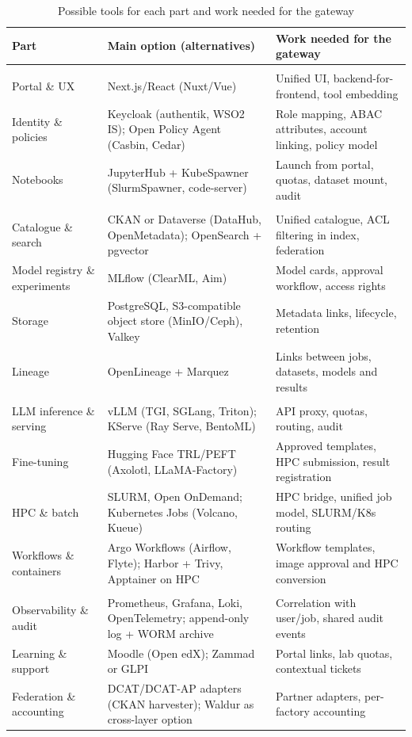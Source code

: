 \documentclass[conference,a4paper]{IEEEtran}
\begin{document}
\begin{table}[t]
\centering
\caption{Possible tools for each part and work needed for the gateway}
\label{tab:tools}
\footnotesize
\renewcommand{\arraystretch}{1.25}
\setlength{\tabcolsep}{4pt}
\newcommand{\grp}[1]{\multicolumn{3}{|l|}{\cellcolor{gray!12}\textbf{\textit{#1}}} \\ \hline}
\begin{tabular}{|>{\raggedright\arraybackslash}p{2.9cm}|>{\raggedright\arraybackslash}p{7.0cm}|>{\raggedright\arraybackslash}p{6.5cm}|}
\hline
\rowcolor{gray!30}
\textbf{Part} & \textbf{Main option (alternatives)} & \textbf{Work needed for the gateway} \\ \hline
\grp{User access}
Portal \& UX & Next.js/React (Nuxt/Vue) & Unified UI, backend-for-frontend, tool embedding \\ \hline
Identity \& policies & Keycloak (authentik, WSO2 IS); Open Policy Agent (Casbin, Cedar) & Role mapping, ABAC attributes, account linking, policy model \\ \hline
Notebooks & JupyterHub + KubeSpawner (SlurmSpawner, code-server) & Launch from portal, quotas, dataset mount, audit \\ \hline
\grp{Data and models}
Catalogue \& search & CKAN or Dataverse (DataHub, OpenMetadata); OpenSearch + pgvector & Unified catalogue, ACL filtering in index, federation \\ \hline
Model registry \& experiments & MLflow (ClearML, Aim) & Model cards, approval workflow, access rights \\ \hline
Storage & PostgreSQL, S3-compatible object store (MinIO/Ceph), Valkey & Metadata links, lifecycle, retention \\ \hline
Lineage & OpenLineage + Marquez & Links between jobs, datasets, models and results \\ \hline
\grp{Compute and inference}
LLM inference \& serving & vLLM (TGI, SGLang, Triton); KServe (Ray Serve, BentoML) & API proxy, quotas, routing, audit \\ \hline
Fine-tuning & Hugging Face TRL/PEFT (Axolotl, LLaMA-Factory) & Approved templates, HPC submission, result registration \\ \hline
HPC \& batch & SLURM, Open OnDemand; Kubernetes Jobs (Volcano, Kueue) & HPC bridge, unified job model, SLURM/K8s routing \\ \hline
Workflows \& containers & Argo Workflows (Airflow, Flyte); Harbor + Trivy, Apptainer on HPC & Workflow templates, image approval and HPC conversion \\ \hline
\grp{Operations and federation}
Observability \& audit & Prometheus, Grafana, Loki, OpenTelemetry; append-only log + WORM archive & Correlation with user/job, shared audit events \\ \hline
Learning \& support & Moodle (Open edX); Zammad or GLPI & Portal links, lab quotas, contextual tickets \\ \hline
Federation \& accounting & DCAT/DCAT-AP adapters (CKAN harvester); Waldur as cross-layer option & Partner adapters, per-factory accounting \\ \hline
\end{tabular}
\end{table}
\end{document}
